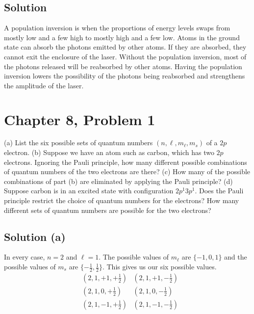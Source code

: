 \documentclass[12pt]{article}
\begin{document}
        \subsection{Solution}
            A population inversion is when the proportions of energy levels swaps from mostly low and a few high to mostly high and a few low. 
            Atoms in the ground state can absorb the photons emitted by other atoms.
            If they are absorbed, they cannot exit the enclosure of the laser. 
            Without the population inversion, most of the photons released will be reabsorbed by other atoms.
            Having the population inversion lowers the possibility of the photons being reabsorbed and strengthens the amplitude of the laser.
    \pagebreak
    
    \section{Chapter 8, Problem 1}
        (a) List the six possible sets of quantum numbers $(n, \ell, m_\ell, m_s)$ of a $2p$ electron. 
        (b) Suppose we have an atom such as carbon, which has two $2p$ electrons. 
        Ignoring the Pauli principle, how many different possible combinations of quantum numbers of the two electrons are there? 
        (c) How many of the possible combinations of part (b) are eliminated by applying the Pauli principle? 
        (d) Suppose carbon is in an excited state with conﬁguration $2p^1 3p^1$. 
        Does the Pauli principle restrict the choice of quantum numbers for the electrons? 
        How many different sets of quantum numbers are possible for the two electrons?
        
        \subsection{Solution (a)}
            In every case, $n = 2$ and $\ell = 1$.
            The possible values of $m_\ell$ are $\{-1, 0, 1\}$ and the possible values of $m_s$ are $\{-\frac{1}{2}, \frac{1}{2}\}$.
            This gives us our six possible values.
            \begin{align*}
                &(2, 1, +1, +\frac{1}{2})   &(2, 1, +1, -\frac{1}{2})\\
                &(2, 1, 0, +\frac{1}{2})    &(2, 1, 0, -\frac{1}{2})\\
                &(2, 1, -1, +\frac{1}{2})   &(2, 1, -1, -\frac{1}{2})
            \end{align*}
\end{document}
